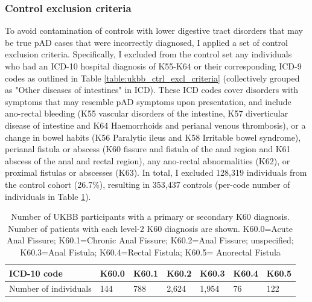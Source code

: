 \subsubsection{Control exclusion criteria}
To avoid contamination of controls with lower digestive tract disorders that may be true pAD cases that were incorrectly diagnosed, I applied a set of control exclusion criteria. Specifically, I excluded from the control set any individuals who had an ICD-10 hospital diagnosis of K55-K64 or their corresponding ICD-9 codes as outlined in Table \ref{table:ukbb_ctrl_excl_criteria} (collectively grouped as "Other diseases of intestines" in ICD). These ICD codes cover disorders with symptoms that may resemble pAD symptoms upon presentation, and include ano-rectal bleeding (K55 vascular disorders of the intestine, K57 diverticular disease of intestine and K64 Haemorrhoids and perianal venous thrombosis), or a change in bowel habits (K56 Paralytic ileus and K58 Irritable bowel syndrome), perianal fistula or abscess (K60 fissure and fistula of the anal region and K61 abscess of the anal and rectal region), any ano-rectal abnormalities (K62), or proximal fistulas or abscesses (K63). In total, I excluded 128,319 individuals from the control cohort (26.7\%), resulting in 353,437 controls (per-code number of individuals in Table \ref{table:ukbb_level2_nums}).



\begin{table}[H]
  \centering
  \caption[Number of UKBB participants with a K60 diagnosis]{Number of UKBB participants with a primary or secondary K60 diagnosis. Number of patients with each level-2 K60 diagnosis are shown. K60.0=Acute Anal Fissure; K60.1=Chronic Anal Fissure; K60.2=Anal Fissure; unspecified; K60.3=Anal Fistula; K60.4=Rectal Fistula; K60.5= Anorectal Fistula}
  \label{table:ukbb_level2_nums}
  \begin{tabular}{|l|l|l|l|l|l|l|}
  \hline
  ICD-10 code           & K60.0  & K60.1  & K60.2  & K60.3 & K60.4 & K60.5\\ \hline
  Number of individuals & 144                      & 788                        & 2,624                           & 1,954              & 76                   & 122                     \\ \hline
  \end{tabular}
  \end{table}




